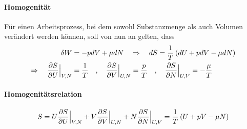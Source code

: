 \vspace{-15pt}

\paragraph{Homogenität}

Für einen Arbeitsprozess, bei dem sowohl Substanzmenge als auch Volumen
verändert werden können, soll von nun an gelten, dass
\begin{align*}
    \delta W &= - p dV + \mu d N
    \hspace{10pt} \Rightarrow \hspace{10pt}
    dS = \frac{1}{T} \left( dU + p dV - \mu dN \right)
    \\
    \Rightarrow \hspace{10pt}
    \frac{\partial S}{\partial U} \Big|_{V,N} &= \frac{1}{T}
    \hspace{10pt} , \hspace{10pt}
    \frac{\partial S}{\partial V} \Big|_{U,N} = \frac{p}{T}
    \hspace{10pt} , \hspace{10pt}
    \frac{\partial S}{\partial N} \Big|_{U,V} = - \frac{\mu}{T}
\end{align*}

\paragraph{Homogenitätsrelation}
\begin{align*}
    S = U \frac{\partial S}{\partial U} \Big|_{V,N} +
        V \frac{\partial S}{\partial V} \Big|_{U,N} +
        N \frac{\partial S}{\partial N} \Big|_{U,V}
    = \frac{1}{T} \left( U + p V - \mu N \right)
\end{align*}




